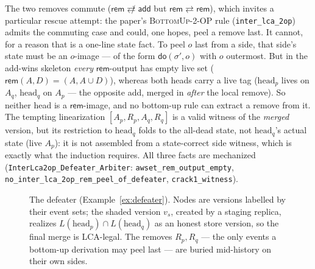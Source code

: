 \documentclass[11pt]{article}
\newcommand{\comm}{\rightleftarrows}
\newcommand{\ncomm}{\not\rightleftarrows}
\newcommand{\add}{\mathsf{add}}
\newcommand{\rem}{\mathsf{rem}}
\newcommand{\lean}[1]{\texttt{#1}}
\begin{document}
The two removes commute ($\rem \ncomm \add$ but $\rem \comm \rem$), which
invites a particular rescue attempt: the paper's \textsc{BottomUp-2-OP}
rule (\lean{inter\_lca\_2op}) admits the commuting case and could, one
hopes, peel a remove last. It cannot, for a reason that is a one-line
state fact. To peel $o$ last from a side, that side's state must be an
$o$-image --- of the form $\mathsf{do}(\sigma', o)$ with $o$ outermost.
But in the add-wins skeleton \emph{every} $\rem$-output has empty live set
($\rem(A,D) = (A, A\cup D)$), whereas both heads carry a live tag
($\mathrm{head}_p$ lives on $A_q$, $\mathrm{head}_q$ on $A_p$ --- the
opposite add, merged in \emph{after} the local remove). So neither head
is a $\rem$-image, and no bottom-up rule can extract a remove from it. The
tempting linearization $[A_p, R_p, A_q, R_q]$ is a valid witness of the
\emph{merged} version, but its restriction to $\mathrm{head}_q$ folds to
the all-dead state, not $\mathrm{head}_q$'s actual state (live $A_p$): it
is not assembled from a state-correct side witness, which is exactly what
the induction requires. All three facts are mechanized
(\lean{InterLca2op\_Defeater\_Arbiter}: \lean{awset\_rem\_output\_empty},
\lean{no\_inter\_lca\_2op\_rem\_peel\_of\_defeater}, \lean{crack1\_witness}).

\begin{figure}[t]
\centering
{}
\caption{The defeater (Example~\ref{ex:defeater}). Nodes are
versions labelled by their event sets; the shaded version $v_s$, created
by a staging replica, realizes $L(\text{head}_p)\cap L(\text{head}_q)$ as
an honest store version, so the final merge is LCA-legal. The removes
$R_p, R_q$ --- the only events a bottom-up derivation may peel last ---
are buried mid-history on their own sides.}
\label{fig:defeater}
\end{figure}
\end{document}
